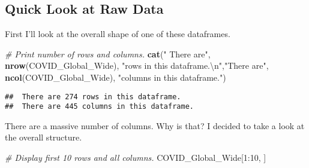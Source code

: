 \documentclass[]{tufte-handout}
\newenvironment{Shaded}{}{}
\newcommand{\CharTok}[1]{\textcolor[rgb]{0.25,0.44,0.63}{#1}}
\newcommand{\CommentTok}[1]{\textcolor[rgb]{0.38,0.63,0.69}{\textit{#1}}}
\newcommand{\DecValTok}[1]{\textcolor[rgb]{0.25,0.63,0.44}{#1}}
\newcommand{\KeywordTok}[1]{\textcolor[rgb]{0.00,0.44,0.13}{\textbf{#1}}}
\newcommand{\NormalTok}[1]{#1}
\newcommand{\OperatorTok}[1]{\textcolor[rgb]{0.40,0.40,0.40}{#1}}
\newcommand{\StringTok}[1]{\textcolor[rgb]{0.25,0.44,0.63}{#1}}
\begin{document}
\hypertarget{quick-look-at-raw-data}{%
\subsection{Quick Look at Raw Data}\label{quick-look-at-raw-data}}

First I'll look at the overall shape of one of these dataframes.

\begin{Shaded}
\begin{Highlighting}[]
\CommentTok{# Print number of rows and columns.}
\KeywordTok{cat}\NormalTok{(}\StringTok{" There are"}\NormalTok{, }\KeywordTok{nrow}\NormalTok{(COVID_Global_Wide), }\StringTok{"rows in this dataframe.}\CharTok{\textbackslash{}n}\StringTok{"}\NormalTok{,}\StringTok{"There are"}\NormalTok{, }\KeywordTok{ncol}\NormalTok{(COVID_Global_Wide), }\StringTok{"columns in this dataframe."}\NormalTok{)}
\end{Highlighting}
\end{Shaded}

\begin{verbatim}
##  There are 274 rows in this dataframe.
##  There are 445 columns in this dataframe.
\end{verbatim}

There are a massive number of columns. Why is that? I decided to take a
look at the overall structure.

\begin{Shaded}
\begin{Highlighting}[]
\CommentTok{# Display first 10 rows and all columns.}
\NormalTok{COVID_Global_Wide[}\DecValTok{1}\OperatorTok{:}\DecValTok{10}\NormalTok{, ]}
\end{Highlighting}
\end{Shaded}
\end{document}
